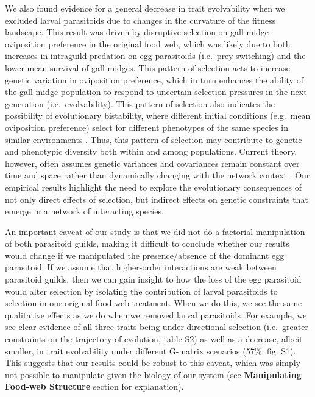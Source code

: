 \documentclass[11pt,]{article}
\begin{document}
We also found evidence for a general decrease in trait evolvability when
we excluded larval parasitoids due to changes in the curvature of the
fitness landscape. This result was driven by disruptive selection on
gall midge oviposition preference in the original food web, which was
likely due to both increases in intraguild predation on egg parasitoids
(i.e.~prey switching) and the lower mean survival of gall midges. This
pattern of selection acts to increase genetic variation in oviposition
preference, which in turn enhances the ability of the gall midge
population to respond to uncertain selection pressures in the next
generation (i.e.~evolvability). This pattern of selection also indicates
the possibility of evolutionary bistability, where different initial
conditions (e.g.~mean oviposition preference) select for different
phenotypes of the same species in similar environments
\citep{Landi2018LifeHistory}. Thus, this pattern of selection may
contribute to genetic and phenotypic diversity both within and among
populations. Current theory, however, often assumes genetic variances
and covariances remain constant over time and space rather than
dynamically changing with the network context
\citep{McPeek2017, Guimaraes2017, Medeiros2018}. Our empirical results
highlight the need to explore the evolutionary consequences of not only
direct effects of selection, but indirect effects on genetic constraints
that emerge in a network of interacting species.

An important caveat of our study is that we did not do a factorial
manipulation of both parasitoid guilds, making it difficult to conclude
whether our results would change if we manipulated the presence/absence
of the dominant egg parasitoid. If we assume that higher-order
interactions \citep{Levine2017} are weak between parasitoid guilds, then
we can gain insight to how the loss of the egg parasitoid would alter
selection by isolating the contribution of larval parasitoids to
selection in our original food-web treatment. When we do this, we see
the same qualitative effects as we do when we removed larval
parasitoids. For example, we see clear evidence of all three traits
being under directional selection (i.e.~greater constraints on the
trajectory of evolution, table S2) as well as a decrease, albeit
smaller, in trait evolvability under different G-matrix scenarios (57\%,
fig. S1). This suggests that our results could be robust to this caveat,
which was simply not possible to manipulate given the biology of our
system (see \textbf{Manipulating Food-web Structure} section for
explanation).
\end{document}
